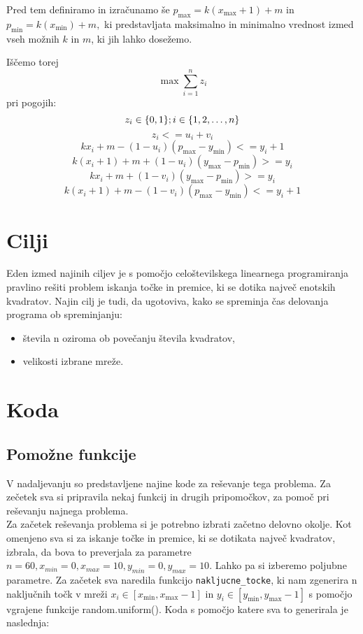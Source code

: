 \documentclass[a4paper]{article}
\begin{document}
Pred tem definiramo in izračunamo še $p_{\max} = k (x_{\max}+1)+m$ in $p_{\min} = k (x_{\min})+m,$ ki predstavljata maksimalno in minimalno vrednost izmed vseh možnih $k$ in $m$, ki jih lahko dosežemo. 

Iščemo torej \\
$$\max\sum_{i=1}^n z_{i} $$
pri pogojih:\\
$$z_{i} \in \{0,1\}; i \in \{1, 2, \dots, n\}\\$$
$$z_i <= u_i + v_i$$   
$$k x_i + m - (1 - u_i) (p_{\max} - y_{\min}) <= y_i + 1$$
$$k (x_i+1) + m + (1 - u_i) (y_{\max} - p_{\min}) >= y_i $$
$$k x_i + m + (1 - v_i) (y_{\max} - p_{\min}) >= y_i$$
$$k (x_i+1) + m - (1 - v_i) (p_{\max} - y_{\min}) <= y_i + 1$$

\section{Cilji}

Eden izmed najinih ciljev je s pomočjo celoštevilskega linearnega programiranja pravlino rešiti problem iskanja točke in premice, ki se dotika največ enotskih kvadratov.
Najin cilj je tudi, da ugotoviva, kako se spreminja čas delovanja programa ob spreminjanju:

\begin{itemize}
\item{števila n oziroma ob povečanju števila kvadratov,}
\item{velikosti izbrane mreže.}
\end{itemize}

\section{Koda}

\subsection{Pomožne funkcije}

V nadaljevanju so predstavljene najine kode za reševanje tega problema.  Za zečetek sva si pripravila nekaj funkcij in drugih pripomočkov, za pomoč pri reševanju najnega problema.
\\
Za začetek reševanja problema si je potrebno izbrati začetno delovno okolje. Kot omenjeno sva si za iskanje točke in premice, ki se dotikata največ kvadratov, izbrala, da bova to preverjala za parametre $n = 60, x_{min} = 0, x_{max} = 10, y_{min} = 0, y_{max} = 10.$ Lahko pa si izberemo poljubne parametre.
Za začetek sva naredila funkcijo \texttt{nakljucne\_tocke}, ki nam zgenerira n naključnih točk v mreži $x_i \in [x_{\min}, x_{\max}-1]$  in $y_i \in [y_{\min}, y_{\max}-1]$ s pomočjo vgrajene funkcije random.uniform(). Koda s pomočjo katere sva to generirala je naslednja:
\end{document}
